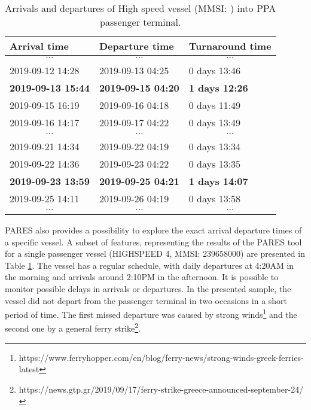 \documentclass[conference]{IEEEtran}
\begin{document}
\begin{table}
    \small
    \centering
    \caption{Arrivals and departures of High speed vessel (MMSI: ) into PPA passenger terminal.}
    \begin{tabular}{lll}
    \toprule
        Arrival time & Departure time & Turnaround time \\
    \midrule
        \multicolumn{1}{c}{$\cdots$} & \multicolumn{1}{c}{$\cdots$} & \multicolumn{1}{c}{$\cdots$} \\
        2019-09-12 14:28 &	2019-09-13 04:25 &	0 days 13:46 \\
        \textbf{2019-09-13 15:44} &	\textbf{2019-09-15 04:20} &	\textbf{1 days 12:26} \\
        2019-09-15 16:19 &	2019-09-16 04:18 &	0 days 11:49 \\
        2019-09-16 14:17 &	2019-09-17 04:22 &	0 days 13:49 \\
        \multicolumn{1}{c}{$\cdots$} & \multicolumn{1}{c}{$\cdots$} & \multicolumn{1}{c}{$\cdots$} \\
        2019-09-21 14:34 &	2019-09-22 04:19 &	0 days 13:34 \\
        2019-09-22 14:36 &	2019-09-23 04:22 &	0 days 13:35 \\
        \textbf{2019-09-23 13:59} &	\textbf{2019-09-25 04:21} &	\textbf{1 days 14:07} \\
        2019-09-25 14:11 &	2019-09-26 04:19 &	0 days 13:58 \\
        \multicolumn{1}{c}{$\cdots$} & \multicolumn{1}{c}{$\cdots$} & \multicolumn{1}{c}{$\cdots$} \\
    \bottomrule
    \end{tabular}
    \label{tbl:hs_vessel_arrivals_departures}
\end{table}



PARES also provides a possibility to explore the exact arrival departure times of a specific vessel. A subset of features, representing the results of the PARES tool for a single passenger vessel (HIGHSPEED 4, MMSI: 239658000) are presented in Table \ref{tbl:hs_vessel_arrivals_departures}. The vessel has a regular schedule, with daily departures at 4:20AM in the morning and arrivals around 2:10PM in the afternoon. It is possible to monitor possible delays in arrivals or departures. In the presented sample, the vessel did not depart from the passenger terminal in two occasions in a short period of time. The first missed departure was caused by strong winds\footnote{https://www.ferryhopper.com/en/blog/ferry-news/strong-winds-greek-ferries-latest} and the second one by a general ferry strike\footnote{https://news.gtp.gr/2019/09/17/ferry-strike-greece-announced-september-24/}.
\end{document}
